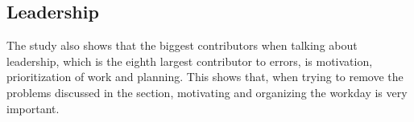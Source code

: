 \subsection{Leadership}
The study also shows that the biggest contributors when talking about leadership, which is the eighth largest contributor to errors, is motivation, prioritization of work and planning. This shows that, when trying to remove the problems discussed in the section, motivating and organizing the workday is very important.
